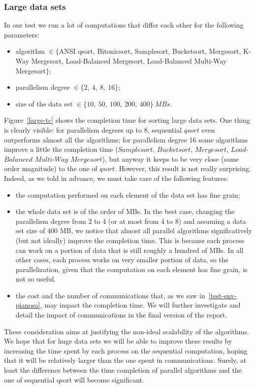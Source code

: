 \subsubsection*{Large data sets}
In our test we run a lot of computations that differ each other for the following parameters:
\begin{itemize}
\item algorithm $\in \lbrace$ANSI qsort, Bitonicsort, Samplesort, Bucketsort, Mergesort, K-Way Mergesort, Load-Balanced Mergesort, Load-Balanced Multi-Way Mergesort$\rbrace$;
\item parallelism degree $\in \lbrace 2,\ 4,\ 8,\ 16 \rbrace$;
\item size of the data set $\in \lbrace 10,\ 50,\ 100,\ 200,\ 400 \rbrace \ MBs$.
\end{itemize} 
Figure~\ref{large-tc} shows the completion time for sorting large data sets. One thing is clearly visible: for parallelism degrees up to 8, sequential $qsort$ even outperforms almost all the algorithms; for parallelism degree 16 some algorithms improve a little the completion time ($Samplesort$, $Bucketsort$, $Mergesort$, $Load$-$Balanced$ $Multi$-$Way$ $Mergesort$), but anyway it keeps to be very close (same order magnitude) to the one of $qsort$. However, this result is not really surprising. Indeed, as we told in advance, we must take care of the following features:
\begin{itemize}
\item the computation performed on each element of the data set has fine grain;
\item the whole data set is of the order of MBs. In the best case, changing the parallelism degree from $2$ to $4$ (or at most from $4$ to $8$) and assuming a data set size of $400$ MB, we notice that almost all parallel algorithms significatively (but not ideally) improve the completion time. This is because each process can work on a portion of data that is still roughly a hundred of MBs. In all other cases, each process works on very smaller portion of data, so the parallelization, given that the computation on each element has fine grain, is not so useful. 
\item the cost and the number of communications that, as we saw in~\ref{test-env-pianosa}, may impact the completion time. We will further investigate and detail the impact of communications in the final version of the report.
\end{itemize}
These consideration aims at justifying the non-ideal scalability of the algorithms. We hope that for huge data sets we will be able to improve these results by increasing the time spent by each process on the sequential computation, hoping that it will be relatively larger than the one spent in communications. Surely, at least the difference between the time completion of parallel algorithms and the one of sequential qsort will become significant.
